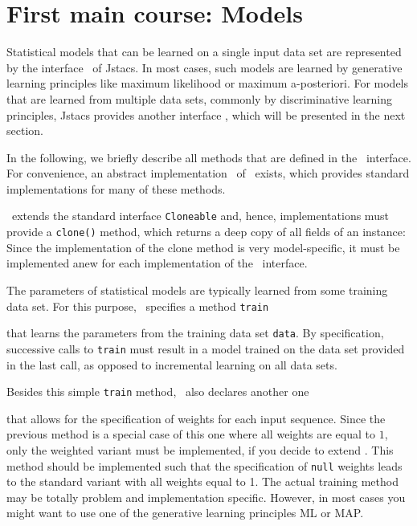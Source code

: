 \section{First main course: Models}

Statistical models that can be learned on a single input data set are represented by the interface \TrainSM~of Jstacs. In most cases, such models are learned by generative learning principles like maximum likelihood or maximum a-posteriori. For models that are learned from multiple data sets, commonly by discriminative learning principles, Jstacs provides another interface \DiffSM, which will be presented in the next section.

In the following, we briefly describe all methods that are defined in the \TrainSM~interface. For convenience, an abstract implementation \AbstractTrainSM~of \TrainSM~exists, which provides standard implementations for many of these methods.

\renewcommand{\codefile}{../../de/jstacs/sequenceScores/SequenceScore.java}
\setcounter{off}{45}


\TrainSM~extends the standard interface \lstinline+Cloneable+ and, hence, implementations must provide a \lstinline+clone()+ method, which returns a deep copy of all fields of an instance:
Since the implementation of the clone method is very model-specific, it must be implemented anew for each implementation of the \TrainSM~interface.

The parameters of statistical models are typically learned from some training data set. For this purpose, \TrainSM~specifies a method \lstinline+train+
\addtocounter{off}{18}
that learns the parameters from the training data set \lstinline+data+. By specification, successive calls to \lstinline+train+ must result in a model trained on the data set provided in the last call, as opposed to incremental learning on all data sets.

Besides this simple \lstinline+train+ method, \TrainSM~also declares another one
\addtocounter{off}{27}
that allows for the specification of weights for each input sequence. Since the previous method is a special case of this one where all weights are equal to $1$, only the weighted variant must be implemented, if you decide to extend \AbstractTrainSM. This method should be implemented such that the specification of \lstinline+null+ weights leads to the standard variant with all weights equal to 1. The actual training method may be totally problem and implementation specific. However, in most cases you might want to use one of the generative learning principles ML or MAP.

